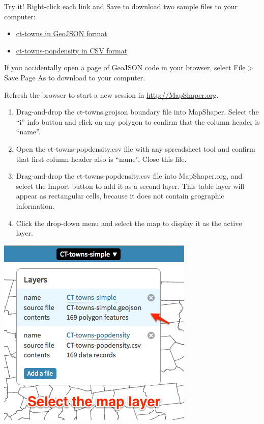 \documentclass[
  english,
]{book}
\providecommand{\tightlist}{%
  \setlength{\itemsep}{0pt}\setlength{\parskip}{0pt}}
\begin{document}
Try it! Right-click each link and Save to download two sample files to your computer:

\begin{itemize}
\tightlist
\item
  \href{data/ct-towns.geojson}{ct-towns in GeoJSON format}
\item
  \href{data/ct-towns-popdensity.csv}{ct-towns-popdensity in CSV format}
\end{itemize}

If you accidentally open a page of GeoJSON code in your browser, select File \textgreater{} Save Page As to download to your computer.

Refresh the browser to start a new session in \url{http://MapShaper.org}.

\begin{enumerate}
\def\labelenumi{\arabic{enumi}.}
\item
  Drag-and-drop the ct-towns.geojson boundary file into MapShaper. Select the ``i'' info button and click on any polygon to confirm that the column header is ``name''.
\item
  Open the ct-towns-popdensity.csv file with any spreadsheet tool and confirm that first column header also is ``name''. Close this file.
\item
  Drag-and-drop the ct-towns-popdensity.csv file into MapShaper.org, and select the Import button to add it as a second layer. This table layer will appear as rectangular cells, because it does not contain geographic information.
\item
  Click the drop-down menu and select the map to display it as the active layer.
\end{enumerate}

\includegraphics{images/09-transform/mapshaper-join-select-map-layer.png}
\end{document}

